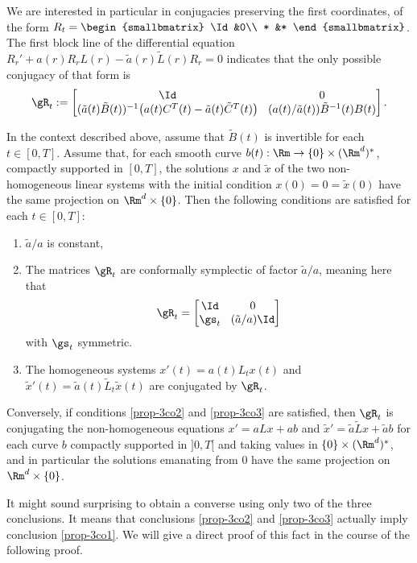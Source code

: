 We are interested in particular in conjugacies preserving the first coordinates, \ie of the form
$R_t = \begin{smallbmatrix} \Id&0\\ * &* \end{smallbmatrix}$. The first block line of the differential equation
$
R_{r}' +a(r)R_{r}L(r)-\tilde a(r)\tilde L(r)R_{r}=0
$
indicates that the only possible conjugacy of that form is
\[\arraycolsep4.5pt
\gR_{t}:=
\begin{bmatrix}
\Id&0\\
(\tilde a(t)\tilde B(t))^{-1}\big( a(t)C^T(t)-\tilde a(t) \tilde C^T(t)\big) & (a(t)/\tilde a(t)) \tilde B^{-1}(t) B(t)
\end{bmatrix}.
\]

\begin{prop}\label{prop-3co}
In the context described above, assume that $\tilde B(t)$ is invertible for each $t\in [0,T]$.
Assume that, for each smooth curve $b(t):\Rm \to \{0\}\times (\Rm^d)^*$, compactly supported in $[0,T]$, the solutions
$x$ and $\tilde x$ of the two non-homogeneous linear systems with the initial condition $x(0)=0=\tilde x(0)$ have the same projection on $\Rm^d\times \{0\}$.
Then the following conditions are satisfied for each $t\in [0,T]$:
\begin{enumerate}
\item\label{prop-3co1} $\tilde a/a$ is constant,
\item\label{prop-3co2} The matrices $\gR_t$ are conformally symplectic of factor $\tilde a/a$, meaning here that
\[\arraycolsep4.5pt
\gR_t=\begin{bmatrix}
\Id&0\\ \gs_t &(\tilde a /a) \Id
\end{bmatrix}\]
with $\gs_t$ symmetric.
\item\label{prop-3co3} The homogeneous systems $x'(t)=a(t)L_tx(t)$ and $\tilde x'(t)=\tilde a(t)\tilde L_t\tilde x(t)$ are conjugated by $\gR_t$.
\end{enumerate}
Conversely, if conditions \eqref{prop-3co2} and \eqref{prop-3co3} are satisfied, then $\gR_t$ is conjugating the non-homogeneous equations $x'= aLx+ab$ and $\tilde x'=\tilde a \tilde L x+\tilde a b$ for each curve $b$ compactly supported in $]0,T[$ and taking
values in $\{0\}\times (\Rm^d)^*$, and in particular the solutions emanating from $0$ have the same projection on $\Rm^d\times \{0\}$.
\end{prop}

It might sound surprising to obtain a converse using only two of the three conclusions. It means that conclusions \eqref{prop-3co2} and \eqref{prop-3co3} actually imply conclusion \eqref{prop-3co1}. We will give a direct proof of this fact in the course of the following proof.

